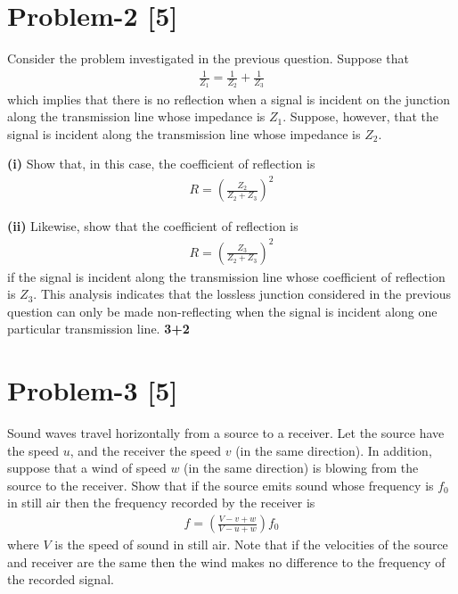 \documentclass[12pt, a4paper]{article}
\begin{document}
\section*{Problem-2 \hfill \textbf{[5]}}
Consider the problem investigated in the previous question. Suppose that
\begin{align*}
    \frac{1}{Z_1}=\frac{1}{Z_2}+\frac{1}{Z_3}
\end{align*}
which implies that there is no reflection when a signal is incident on the junction along the 
transmission line whose impedance is $Z_1$. Suppose, however, that the signal is incident along 
the transmission line whose impedance is $Z_2$.

\textbf{(i)} Show that, in this case, the coefficient of reflection is
\begin{align*}
    R=\left(\frac{Z_2}{Z_2+Z_3}\right)^{2}
\end{align*}

\textbf{(ii)} Likewise, show that the coefficient of reflection is
\begin{align*}
    R=\left(\frac{Z_3}{Z_2+Z_3}\right)^{2}
\end{align*}
if the signal is incident along the transmission line whose coefficient of reflection is $Z_3$.
This analysis indicates that the lossless junction considered in the previous question can only 
be made non-reflecting when the signal is incident along one particular transmission line.
\hfill\textbf{3+2}

\section*{Problem-3 \hfill \textbf{[5]}}
Sound waves travel horizontally from a source to a receiver. Let the source have the speed $u$, and 
the receiver the speed $v$ (in the same direction). In addition, suppose that a wind of speed $w$ 
(in the same direction) is blowing from the source to the receiver. Show that if the source emits 
sound whose frequency is $f_0$ in still air then the frequency recorded by the receiver is
\begin{align*}
    f =\left(\frac{V-v+w}{V-u+w}\right)f_0
\end{align*}
where $V$ is the speed of sound in still air. Note that if the velocities of the source and receiver 
are the same then the wind makes no difference to the frequency of the recorded signal.
\end{document}
